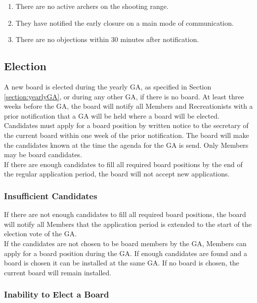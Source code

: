 \documentclass[a4paper]{article}
\begin{document}
\begin{enumerate}
\item There are no active archers on the shooting range.
\item They have notified the early closure on a main mode of communication.
\item There are no objections within 30 minutes after notification.
\end{enumerate}

\subsection{Election}
A new board is elected during the yearly GA, as specified in Section \ref{section:yearlyGA}, or during any other GA, if there is no board. At least three weeks before the GA, the board will notify all Members and Recreationists with a prior notification that a GA will be held where a board will be elected. Candidates must apply for a board position by written notice to the secretary of the current board within one week of the prior notification. The board will make the candidates known at the time the agenda for the GA is send. Only Members may be board candidates. \\

If there are enough candidates to fill all required board positions by the end of the regular application period, the board will not accept new applications. \\

\subsubsection{Insufficient Candidates}

If there are not enough candidates to fill all required board positions, the board will notify all Members that the application period is extended to the start of the election vote of the GA. \\

If the candidates are not chosen to be board members by the GA, Members can apply for a board position during the GA. If enough candidates are found and a board is chosen it can be installed at the same GA. If no board is chosen, the current board will remain installed.

\subsubsection{Inability to Elect a Board}
\end{document}
